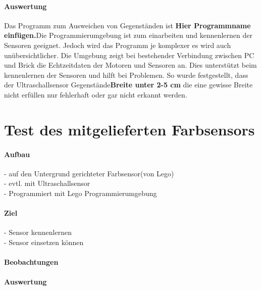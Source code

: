 \paragraph{Auswertung}
Das Programm zum Ausweichen von Gegenständen ist \textbf{Hier Programmname einfügen.}Die Programmierumgebung ist zum einarbeiten und kennenlernen der Sensoren geeignet. Jedoch wird das Programm je komplexer es wird auch unübersichtlicher. Die Umgebung zeigt bei bestehender Verbindung zwischen PC und Brick die Echtzeitdaten der Motoren und Sensoren an. Dies unterstützt beim kennenlernen der Sensoren und hilft bei Problemen. So wurde festgestellt, dass der Ultraschallsensor Gegenstände\textbf{Breite unter 2-5 cm} die eine gewisse Breite nicht erfüllen nur fehlerhaft oder gar nicht erkannt werden.  

\section{Test des mitgelieferten Farbsensors}
\paragraph{Aufbau}
- auf den Untergrund gerichteter Farbsensor(von Lego)\\
- evtl. mit Ultraschallsensor\\
- Programmiert mit Lego Programmierumgebung\\

\paragraph{Ziel}
- Sensor kennenlernen\\
- Sensor einsetzen können\\

\paragraph{Beobachtungen}
\paragraph{Auswertung}